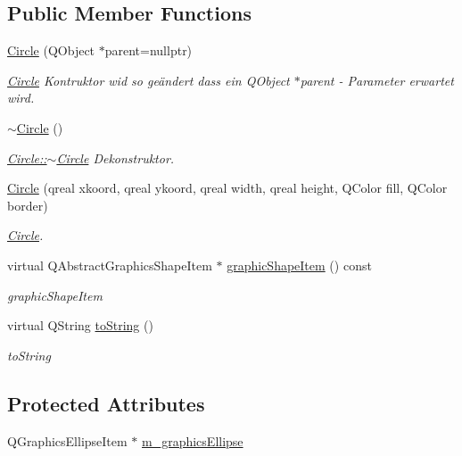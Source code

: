 \subsection*{Public Member Functions}
\begin{DoxyCompactItemize}
\item 
\hyperlink{class_circle_a9851632042d96e4e534bebbec65e92c3}{Circle} (Q\+Object $\ast$parent=nullptr)
\begin{DoxyCompactList}\small\item\em \hyperlink{class_circle}{Circle} Kontruktor wid so geändert dass ein Q\+Object $\ast$parent -\/ Parameter erwartet wird. \end{DoxyCompactList}\item 
\hyperlink{class_circle_ae3f30436e645d73e368e8ee55f8d1650}{$\sim$\+Circle} ()
\begin{DoxyCompactList}\small\item\em \hyperlink{class_circle_ae3f30436e645d73e368e8ee55f8d1650}{Circle\+::$\sim$\+Circle} Dekonstruktor. \end{DoxyCompactList}\item 
\hyperlink{class_circle_a4e15e9f73da6961e60965dd2fdb0d19a}{Circle} (qreal xkoord, qreal ykoord, qreal width, qreal height, Q\+Color fill, Q\+Color border)
\begin{DoxyCompactList}\small\item\em \hyperlink{class_circle}{Circle}. \end{DoxyCompactList}\item 
virtual Q\+Abstract\+Graphics\+Shape\+Item $\ast$ \hyperlink{class_circle_a2c6dda8b50d9e19448d2e328b74430ce}{graphic\+Shape\+Item} () const
\begin{DoxyCompactList}\small\item\em graphic\+Shape\+Item \end{DoxyCompactList}\item 
virtual Q\+String \hyperlink{class_circle_a2fea55f4310daa23eb8c103bdcdcabd6}{to\+String} ()
\begin{DoxyCompactList}\small\item\em to\+String \end{DoxyCompactList}\end{DoxyCompactItemize}
\subsection*{Protected Attributes}
\begin{DoxyCompactItemize}
\item 
Q\+Graphics\+Ellipse\+Item $\ast$ \hyperlink{class_circle_aad3490d575b91461697136e1cad4e6a5}{m\+\_\+graphics\+Ellipse}
\end{DoxyCompactItemize}
